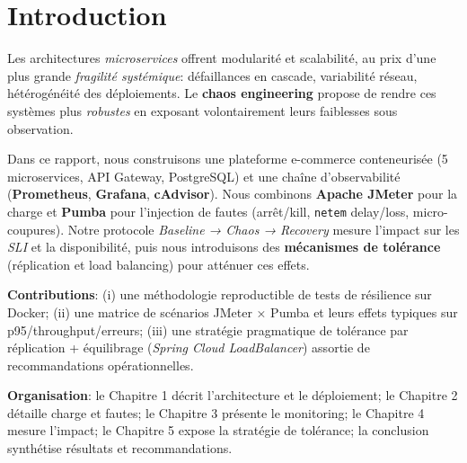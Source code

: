 \chapter*{Introduction}

Les architectures \textit{microservices} offrent modularité et scalabilité, au prix d'une plus grande \textit{fragilité systémique}: 
défaillances en cascade, variabilité réseau, hétérogénéité des déploiements. 
Le \textbf{chaos engineering} propose de rendre ces systèmes plus \textit{robustes} en exposant volontairement leurs faiblesses sous observation.

Dans ce rapport, nous construisons une plateforme e-commerce conteneurisée (5 microservices, API Gateway, PostgreSQL) et une chaîne d'observabilité (\textbf{Prometheus}, \textbf{Grafana}, \textbf{cAdvisor}). 
Nous combinons \textbf{Apache JMeter} pour la charge et \textbf{Pumba} pour l'injection de fautes (arrêt/kill, \texttt{netem} delay/loss, micro-coupures). 
Notre protocole \textit{Baseline → Chaos → Recovery} mesure l'impact sur les \textit{SLI} et la disponibilité, puis nous introduisons des \textbf{mécanismes de tolérance} (réplication et load balancing) pour atténuer ces effets.

\textbf{Contributions}:
(i) une méthodologie reproductible de tests de résilience sur Docker; 
(ii) une matrice de scénarios JMeter × Pumba et leurs effets typiques sur p95/throughput/erreurs; 
(iii) une stratégie pragmatique de tolérance par réplication + équilibrage (\textit{Spring Cloud LoadBalancer}) assortie de recommandations opérationnelles.

\textbf{Organisation}:
le Chapitre 1 décrit l'architecture et le déploiement; 
le Chapitre 2 détaille charge et fautes; 
le Chapitre 3 présente le monitoring; 
le Chapitre 4 mesure l'impact; 
le Chapitre 5 expose la stratégie de tolérance; 
la conclusion synthétise résultats et recommandations.
